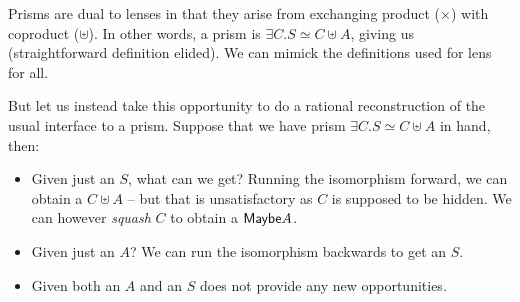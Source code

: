 \documentclass[sigplan,review,anonymous]{acmart}\settopmatter{printfolios=true,printccs=false,printacmref=false}
\begin{document}
Prisms are dual to lenses in that they arise from exchanging product ($×$)
with coproduct ($⊎$). In other words, a prism is $∃C. S ≃ C ⊎ A$, giving us
 (straightforward definition elided). We can mimick
the definitions used for lens for all.


But let us instead take this opportunity to do a rational reconstruction of
the usual interface to a prism.  Suppose that we have prism $∃C. S ≃ C ⊎ A$
in hand, then:
\begin{itemize}
\item Given just an $S$, what can we get? Running the isomorphism
forward, we can obtain a $C ⊎ A$ -- but that is unsatisfactory as $C$ is supposed
to be hidden. We can however \emph{squash} $C$ to obtain a $\AgdaRecord{Maybe} A$.
\item Given just an $A$? We can run the isomorphism backwards to get an $S$.
\item Given both an $A$ and an $S$ does not provide any new opportunities.
\end{itemize}
\end{document}
